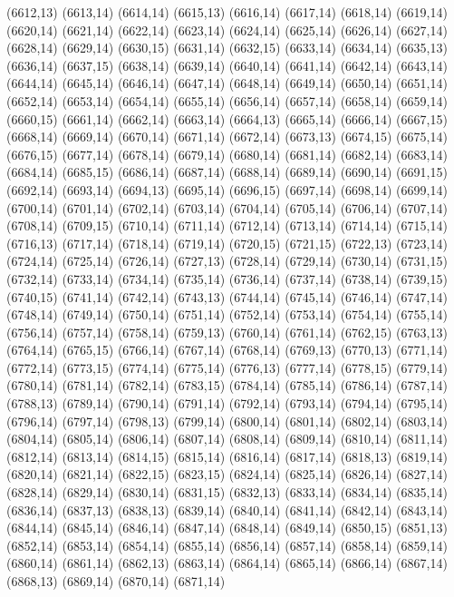 (6612,13)
(6613,14)
(6614,14)
(6615,13)
(6616,14)
(6617,14)
(6618,14)
(6619,14)
(6620,14)
(6621,14)
(6622,14)
(6623,14)
(6624,14)
(6625,14)
(6626,14)
(6627,14)
(6628,14)
(6629,14)
(6630,15)
(6631,14)
(6632,15)
(6633,14)
(6634,14)
(6635,13)
(6636,14)
(6637,15)
(6638,14)
(6639,14)
(6640,14)
(6641,14)
(6642,14)
(6643,14)
(6644,14)
(6645,14)
(6646,14)
(6647,14)
(6648,14)
(6649,14)
(6650,14)
(6651,14)
(6652,14)
(6653,14)
(6654,14)
(6655,14)
(6656,14)
(6657,14)
(6658,14)
(6659,14)
(6660,15)
(6661,14)
(6662,14)
(6663,14)
(6664,13)
(6665,14)
(6666,14)
(6667,15)
(6668,14)
(6669,14)
(6670,14)
(6671,14)
(6672,14)
(6673,13)
(6674,15)
(6675,14)
(6676,15)
(6677,14)
(6678,14)
(6679,14)
(6680,14)
(6681,14)
(6682,14)
(6683,14)
(6684,14)
(6685,15)
(6686,14)
(6687,14)
(6688,14)
(6689,14)
(6690,14)
(6691,15)
(6692,14)
(6693,14)
(6694,13)
(6695,14)
(6696,15)
(6697,14)
(6698,14)
(6699,14)
(6700,14)
(6701,14)
(6702,14)
(6703,14)
(6704,14)
(6705,14)
(6706,14)
(6707,14)
(6708,14)
(6709,15)
(6710,14)
(6711,14)
(6712,14)
(6713,14)
(6714,14)
(6715,14)
(6716,13)
(6717,14)
(6718,14)
(6719,14)
(6720,15)
(6721,15)
(6722,13)
(6723,14)
(6724,14)
(6725,14)
(6726,14)
(6727,13)
(6728,14)
(6729,14)
(6730,14)
(6731,15)
(6732,14)
(6733,14)
(6734,14)
(6735,14)
(6736,14)
(6737,14)
(6738,14)
(6739,15)
(6740,15)
(6741,14)
(6742,14)
(6743,13)
(6744,14)
(6745,14)
(6746,14)
(6747,14)
(6748,14)
(6749,14)
(6750,14)
(6751,14)
(6752,14)
(6753,14)
(6754,14)
(6755,14)
(6756,14)
(6757,14)
(6758,14)
(6759,13)
(6760,14)
(6761,14)
(6762,15)
(6763,13)
(6764,14)
(6765,15)
(6766,14)
(6767,14)
(6768,14)
(6769,13)
(6770,13)
(6771,14)
(6772,14)
(6773,15)
(6774,14)
(6775,14)
(6776,13)
(6777,14)
(6778,15)
(6779,14)
(6780,14)
(6781,14)
(6782,14)
(6783,15)
(6784,14)
(6785,14)
(6786,14)
(6787,14)
(6788,13)
(6789,14)
(6790,14)
(6791,14)
(6792,14)
(6793,14)
(6794,14)
(6795,14)
(6796,14)
(6797,14)
(6798,13)
(6799,14)
(6800,14)
(6801,14)
(6802,14)
(6803,14)
(6804,14)
(6805,14)
(6806,14)
(6807,14)
(6808,14)
(6809,14)
(6810,14)
(6811,14)
(6812,14)
(6813,14)
(6814,15)
(6815,14)
(6816,14)
(6817,14)
(6818,13)
(6819,14)
(6820,14)
(6821,14)
(6822,15)
(6823,15)
(6824,14)
(6825,14)
(6826,14)
(6827,14)
(6828,14)
(6829,14)
(6830,14)
(6831,15)
(6832,13)
(6833,14)
(6834,14)
(6835,14)
(6836,14)
(6837,13)
(6838,13)
(6839,14)
(6840,14)
(6841,14)
(6842,14)
(6843,14)
(6844,14)
(6845,14)
(6846,14)
(6847,14)
(6848,14)
(6849,14)
(6850,15)
(6851,13)
(6852,14)
(6853,14)
(6854,14)
(6855,14)
(6856,14)
(6857,14)
(6858,14)
(6859,14)
(6860,14)
(6861,14)
(6862,13)
(6863,14)
(6864,14)
(6865,14)
(6866,14)
(6867,14)
(6868,13)
(6869,14)
(6870,14)
(6871,14)
